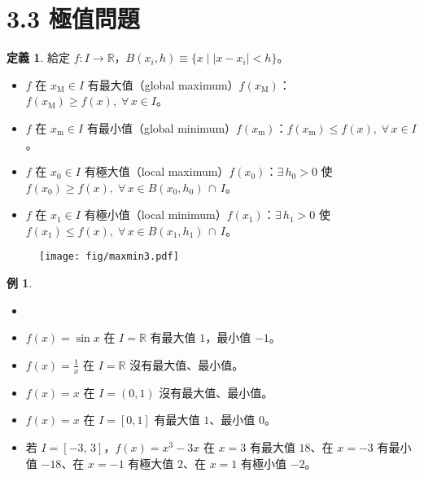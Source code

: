 \documentclass[12pt]{extarticle}
\newcommand{\ds}{\displaystyle}
\theoremstyle{definition}
\newtheorem*{dfn}{定義}
\newtheorem*{ex}{例}
\newcommand{\myline}{\noindent\makebox[\linewidth]{\rule{\paperwidth}{0.4pt}}}
\begin{document}
\myline

\section*{3.3 極值問題}

\begin{dfn}
  給定 $f:I\to\mathbb{R}$，$\ds B(x_i, h)\equiv\{x\;|\;|x - x_i| < h\}$。
  \begin{itemize}\setlength\itemsep{0em}
    \item $f$ 在 $\ds x_\text{M}\in I$ 有最大值（global maximum）$\ds f(x_\text{M})$：$\ds f(x_\text{M})\geqslant f(x),\;\forall\,x\in I$。
    \item $f$ 在 $\ds x_\text{m}\in I$ 有最小值（global minimum）$\ds f(x_\text{m})$：$\ds f(x_\text{m})\leqslant f(x),\;\forall\,x\in I$。
    \item $f$ 在 $\ds x_0\in I$ 有極大值（local maximum）$\ds f(x_0)$：$\ds\exists\,h_0 > 0$ 使 $\ds f(x_0)\geqslant f(x),\;\forall\,x\in B(x_0, h_0)\,\cap\,I$。
    \item $f$ 在 $\ds x_1\in I$ 有極小值（local minimum）$\ds f(x_1)$：$\ds\exists\,h_1 > 0$ 使 $\ds f(x_1)\leqslant f(x),\;\forall\,x\in B(x_1, h_1)\,\cap\,I$。
  \end{itemize}
\end{dfn}

\begin{figure}[!htbp]
  \centering
  \texttt{[image: fig/maxmin3.pdf]}
  \hspace{25mm}
\end{figure}

\begin{ex}
  \begin{itemize}\setlength\itemsep{0em}
    \item[]
    \item $\ds f(x) = \sin x$ 在 $I = \mathbb{R}$ 有最大值 $1$，最小值 $-1$。
    \item $\ds f(x) = \frac{1}{x}$ 在 $I = \mathbb{R}$ 沒有最大值、最小值。
    \item $\ds f(x) = x$ 在 $I = (0, 1)$ 沒有最大值、最小值。
    \item $\ds f(x) = x$ 在 $I = [0, 1]$ 有最大值 $1$、最小值 $0$。
    \item 若 $I = [-3,\,3]$，$\ds f(x) = x^3 - 3x$ 在 $x = 3$ 有最大值 $18$、在 $x = -3$ 有最小值 $-18$、在 $x = -1$ 有極大值 $2$、在 $x = 1$ 有極小值 $-2$。
  \end{itemize}
\end{ex}
\end{document}
